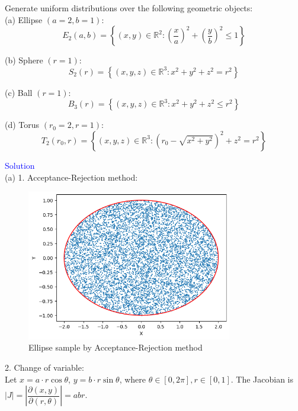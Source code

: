 \begin{homeworkProblem}

Generate uniform distributions over the following geometric objects: \\
(a) Ellipse $(a=2, b=1)$:
$$E_2(a, b)=\left\{(x, y) \in \mathbb{R}^2:\left(\frac{x}{a}\right)^2+\left(\frac{y}{b}\right)^2 \leq 1\right\}$$

(b) Sphere $(r=1)$:
$$S_2(r)=\left\{(x, y, z) \in \mathbb{R}^3: x^2+y^2+z^2=r^2\right\}$$

(c) Ball $(r=1)$:
$$B_3(r)=\left\{(x, y, z) \in \mathbb{R}^3: x^2+y^2+z^2 \leq r^2\right\}$$

(d) Torus $\left(r_0=2, r=1\right)$:
$$T_2\left(r_0, r\right)=\left\{(x, y, z) \in \mathbb{R}^3:\left(r_0-\sqrt{x^2+y^2}\right)^2+z^2=r^2\right\}$$

\textcolor{blue}{Solution} \\

(a) 1. Acceptance-Rejection method: \\
\begin{figure}[h]
    \centering
    \includegraphics[width=0.8\textwidth]{./figure/p7/a_accept_reject.png}
    \caption{Ellipse sample by Acceptance-Rejection method}
\end{figure}

2. Change of variable: \\
Let $x=a\cdot r\cos\theta$, $y=b\cdot r\sin\theta$, where $\theta\in [0, 2\pi], r\in [0, 1]$. The Jacobian is $|J|=\left|\dfrac{\partial(x, y)}{\partial(r, \theta)}\right|=abr$.


\end{homeworkProblem}
